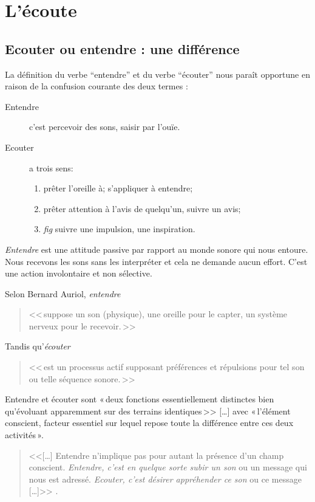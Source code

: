 \chapter{L'écoute}

\section{Ecouter ou entendre : une différence}

La définition du verbe ``entendre'' et du verbe ``écouter'' 
\autocite[pp. 361--385]{hachette:dictionnaire} nous paraît opportune
en raison de la confusion courante des deux termes :
\begin{description}
\item[Entendre] c'est  percevoir des sons, saisir par l'ouïe.
\item[Ecouter] a trois sens: 
\begin{enumerate}
	\item prêter l'oreille à; s'appliquer à entendre;
	\item prêter attention à l'avis de quelqu'un, suivre un avis;
	\item \emph{fig} suivre une impulsion,	une inspiration.
\end{enumerate}
\end{description}



\emph{Entendre} est une attitude passive par rapport au monde sonore
qui nous entoure. Nous recevons les sons sans les interpréter et cela
ne demande aucun effort. C'est une action involontaire et non
sélective. 

Selon Bernard Auriol\autocite[p. 2, ch	. 1]{auriol:cle}, \textit{entendre} 
\begin{quote}
	<<\,suppose un son (physique), une oreille
	pour le capter, un système nerveux pour le recevoir.\,>>
\end{quote} 
Tandis qu'\textit{écouter}
\begin{quote}
	<<\,est un
	processus actif supposant préférences et répulsions pour tel son ou
	telle séquence sonore.\,>>
\end{quote}


Entendre et écouter sont «\,deux
fonctions essentiellement distinctes bien qu'évoluant apparemment sur
des terrains identiques\,>>
[\dots] avec «\,l'élément conscient, facteur essentiel sur lequel repose toute la
différence entre ces deux activités\,».\autocite[]{tomatis_oreille_1991}
\begin{quote}
	
	<<[\ldots] Entendre n'implique pas pour autant la pré\-sen\-ce d'un champ
	conscient. \emph{Entendre, c'est en quelque sorte subir
		un son} ou un message qui nous est adressé. \emph{Ecouter, c'est désirer appréhender ce son} ou ce message [\ldots]>>
	\autocite{tomatis:education}.	
\end{quote}



